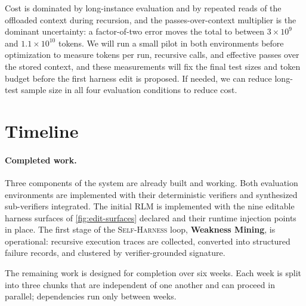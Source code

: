 \documentclass{article}
\newcommand{\rlm}{\textsc{RLM}\xspace}
\newcommand{\sh}{\textsc{Self-Harness}\xspace}
\begin{document}
Cost is dominated by long-instance evaluation and by repeated reads of the offloaded context during recursion, and the passes-over-context multiplier is the dominant uncertainty: a factor-of-two error moves the total to between $3\times10^{9}$ and $1.1\times10^{10}$ tokens. We will run a small pilot in both environments before optimization to measure tokens per run, recursive calls, and effective passes over the stored context, and these measurements will fix the final test sizes and token budget before the first harness edit is proposed. If needed, we can reduce long-test sample size in all four evaluation conditions to reduce cost.

  \section{Timeline}

\paragraph{Completed work.} Three components of the system are already built and working. Both evaluation environments are implemented with their deterministic verifiers and synthesized sub-verifiers integrated. The initial \rlm{} is implemented with the nine editable harness surfaces of \cref{fig:edit-surfaces} declared and their runtime injection points in place. The first stage of the \sh{} loop, \textbf{Weakness Mining}, is operational: recursive execution traces are collected, converted into structured failure records, and clustered by verifier-grounded signature.

The remaining work is designed for completion over six weeks. Each week is split into three chunks that are independent of one another and can proceed in parallel; dependencies run only between weeks.
\end{document}
